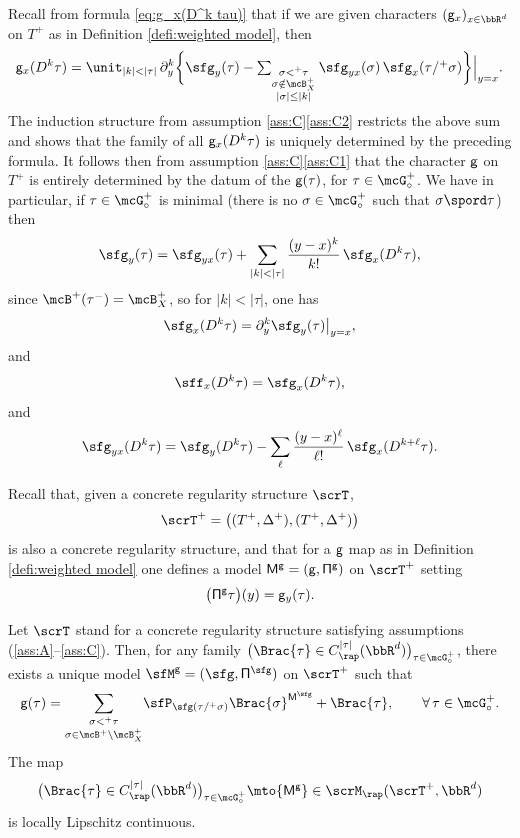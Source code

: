 Recall from formula \eqref{eq:g_x(D^k tau)} that if we are given characters $({\sf g}_x)_{x\in\bbR^d}$ on $T^+$ as in Definition \ref{defi:weighted model}, then
\begin{equation} \label{EqGxDkTau}
{\sf g}_x(D^k\tau) = \unit_{|k|<|\tau|}\, \partial_y^k\bigg\{\sfg_y(\tau) - \textstyle\sum_{\substack{\sigma<^+\tau\\\sigma\notin\mcB_X^+\\|\sigma| \le |k|}} \sfg_{yx}(\sigma)\,\sfg_x(\tau/^+\sigma)\bigg\}\Big|_{y=x}.
\end{equation}
The induction structure from assumption \ref{ass:C}\eqref{ass:C2} restricts the above sum and shows that the family of all ${\sf g}_x(D^k\tau)$ is uniquely determined by the preceding formula. It follows then from assumption \ref{ass:C}\eqref{ass:C1} that the character $\sf g$ on $T^+$ is entirely determined by the datum of the ${\sf g}(\tau)$, for $\tau\in\mcG_\circ^+$. We have in particular, if $\tau\in\mcG_\circ^+$ is minimal (\ie there is no $\sigma\in\mcG_\circ^+$ such that $\sigma\spord\tau$) then
\[
\sfg_y(\tau) = \sfg_{yx}(\tau) + \sum_{\vert k\vert<\vert\tau\vert}\frac{(y-x)^k}{k!}\,\sfg_x(D^k\tau),
\]
since $\mcB^+(\tau^-)=\mcB_X^+$, so for $\vert k\vert<\vert\tau\vert$, one has
\begin{equation} \label{EqDefnGD}
\sfg_x(D^k\tau) = \partial^k_y\sfg_y(\tau)\big\vert_{y=x},
\end{equation}
and
\[
\sff_x(D^k\tau) = \sfg_x(D^k\tau),
\]
and
\begin{equation} \label{EqDefnG2D}
\sfg_{yx}(D^k\tau) = \sfg_y(D^k\tau) - \sum_\ell \frac{(y-x)^\ell}{\ell !}\,\sfg_x(D^{k+\ell}\tau).
\end{equation}

Recall that, given a concrete regularity structure $\scrT$,
\[
\scrT^+ = \bigl((T^+,\Delta^+),(T^+,\Delta^+)\bigr)
\]
is also a concrete regularity structure, and that for a $\sf g$ map as in Definition \ref{defi:weighted model} one defines a model ${\sf M^g = (g,\Pi^g)}$ on $\scrT^+$ setting
\[
\bigl({\sf \Pi^g}\tau\bigr)(y) = {\sf g}_{y}(\tau).
\]

\begin{thm} \label{mainresult:reconst of g}
Let $\scrT$ stand for a concrete regularity structure satisfying assumptions \textup{(\ref{ass:A}--\ref{ass:C})}. Then, for any family $\bigl(\Brac{\tau}\in C^{|\tau|}_\rap(\bbR^d)\bigr)_{\tau\in\mcG^+_\circ}$, there exists a unique model $\sfM^{\sf g} = (\sfg,{\sf\Pi}^\sfg)$ on $\scrT^+$ such that
\begin{equation} \label{EqgTau}
{\sf g}(\tau) = \underset{\sigma\in\mcB^+\setminus \mcB_X^+}{\sum_{\sigma<^+\tau}} \sfP_{\sfg(\tau/^+\sigma)}\Brac{\sigma}^{{\sf M}^{\sfg}} + \Brac{\tau}, \qquad \forall\,\tau\in\mcG^+_\circ.
\end{equation}
The map
\begin{equation} \label{EqMap}
\bigl(\Brac{\tau}\in C^{|\tau|}_\rap(\bbR^d)\bigr)_{\tau\in\mcG^+_\circ} \mto {\sf M^g}\in\scrM_\rap(\scrT^+,\bbR^d)
\end{equation}
is locally Lipschitz continuous.
\end{thm}

